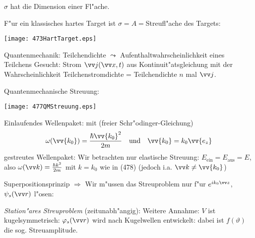 \documentclass[a4paper]{scrartcl}
\begin{document}
$\sigma$ hat die Dimension einer Fl"ache.

F"ur ein klassisches hartes Target ist $\sigma = A = $Streufl"ache des Targets:
\begin{center}
\texttt{[image: 473HartTarget.eps]}
\end{center}
Quantenmechanik:
\setcounter{equation}{165}
Teilchendichte $\leadsto$ Aufenthaltwahrscheinlichkeit eines Teilchens
\setcounter{equation}{473}
Gesucht: Strom $\vv j(\vv x, t)$ aus Kontinuit"atsgleichung
 mit der Wahrscheinlichkeit 
Teilchenstromdichte = Teilchendichte $n$ mal $\vv j$.

Quantenmechanische Streuung:
\begin{center}
\texttt{[image: 477QMStreuung.eps]}
\end{center}
Einlaufendes Wellenpaket:
mit (freier Schr"odinger-Gleichung)
$$\omega(\vv{k_0}) = \frac{\hbar \vv{k_0}^2}{2m} \quad \mathrm{und} \quad \vv{k_0} = k_0 \vv{e_z}$$
gestreutes Wellenpaket:
Wir betrachten nur elastische Streuung: $E_\mathrm{ein} = E_\mathrm{aus} = E$, also $\omega(\vv k) = \frac{\hbar k^2}{2m}$ mit $k=k_0$ wie in (478) (jedoch i.a. $\vv k \neq \vv{k_0}$)

Superpositionsprinzip $\Longrightarrow$ Wir m"ussen das Streuproblem nur f"ur $e^{i k_0 \vv z}$, $\psi_s(\vv r)$ l"osen:

\emph{Station"ares Streuproblem} (zeitunabh"angig):
Weitere Annahme: $V$ ist kugelsymmetrisch:
$\phi_s(\vv r)$ wird nach Kugelwellen entwickelt:
dabei ist $f(\vartheta)$ die sog. Streuamplitude.
\end{document}
